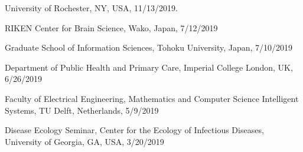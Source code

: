 \documentclass[11pt,letter]{article}
\renewenvironment{itemize}{
  \begin{list}{}{
    \setlength{\leftmargin}{1.5em}
    \setlength{\itemsep}{0.25em}
    \setlength{\parskip}{0pt}
    \setlength{\parsep}{0.25em}
  }
}{
  \end{list}
}
\begin{document}
\begin{itemize}

\item
University of Rochester, NY, USA, 11/13/2019.


\item
RIKEN Center for Brain Science, Wako, Japan, 7/12/2019

Graduate School of Information Sciences, Tohoku University, Japan, 7/10/2019

\item
Department of Public Health and Primary Care, Imperial College London, UK, 6/26/2019

\item
Faculty of Electrical Engineering, Mathematics and Computer Science
Intelligent Systems, TU Delft, Netherlands, 5/9/2019



Disease Ecology Seminar, Center for the Ecology of Infectious Diseases, University of Georgia, GA, USA, 3/20/2019




\end{itemize}
\end{document}
